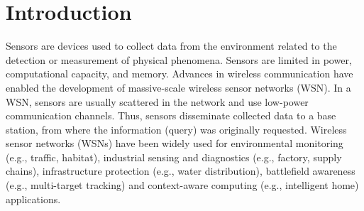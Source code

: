 \documentclass[conference]{IEEEtran}
\begin{document}




%
\IEEEpeerreviewmaketitle



\section{Introduction}


Sensors are devices used to collect data from the environment related to the
detection or measurement of physical phenomena. Sensors are limited in power,
computational capacity, and memory. Advances in wireless communication have
enabled the development of massive-scale wireless sensor networks (WSN). In a
WSN, sensors are usually scattered in the network and use low-power
communication channels. Thus, sensors disseminate collected data to a base
station, from where the information (query) was originally requested. Wireless
sensor networks (WSNs) have been widely used for environmental monitoring (e.g.,
traffic, habitat), industrial sensing and diagnostics (e.g., factory, supply
chains), infrastructure protection (e.g., water distribution), battlefield
awareness (e.g., multi-target tracking) and context-aware computing (e.g.,
intelligent home) applications.


\end{document}
